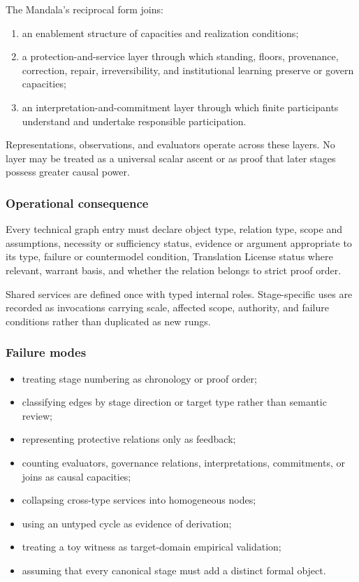 \documentclass[
  11pt,
]{article}
\providecommand{\tightlist}{%
  \setlength{\itemsep}{0pt}\setlength{\parskip}{0pt}}
\begin{document}
The Mandala's reciprocal form joins:

\begin{enumerate}
\def\labelenumi{\arabic{enumi}.}
\tightlist
\item
  an enablement structure of capacities and realization conditions;
\item
  a protection-and-service layer through which standing, floors,
  provenance, correction, repair, irreversibility, and institutional
  learning preserve or govern capacities;
\item
  an interpretation-and-commitment layer through which finite
  participants understand and undertake responsible participation.
\end{enumerate}

Representations, observations, and evaluators operate across these
layers. No layer may be treated as a universal scalar ascent or as proof
that later stages possess greater causal power.

\subsubsection{Operational
consequence}\label{operational-consequence-22}

Every technical graph entry must declare object type, relation type,
scope and assumptions, necessity or sufficiency status, evidence or
argument appropriate to its type, failure or countermodel condition,
Translation License status where relevant, warrant basis, and whether
the relation belongs to strict proof order.

Shared services are defined once with typed internal roles.
Stage-specific uses are recorded as invocations carrying scale, affected
scope, authority, and failure conditions rather than duplicated as new
rungs.

\subsubsection{Failure modes}\label{failure-modes-14}

\begin{itemize}
\tightlist
\item
  treating stage numbering as chronology or proof order;
\item
  classifying edges by stage direction or target type rather than
  semantic review;
\item
  representing protective relations only as feedback;
\item
  counting evaluators, governance relations, interpretations,
  commitments, or joins as causal capacities;
\item
  collapsing cross-type services into homogeneous nodes;
\item
  using an untyped cycle as evidence of derivation;
\item
  treating a toy witness as target-domain empirical validation;
\item
  assuming that every canonical stage must add a distinct formal object.
\end{itemize}
\end{document}

